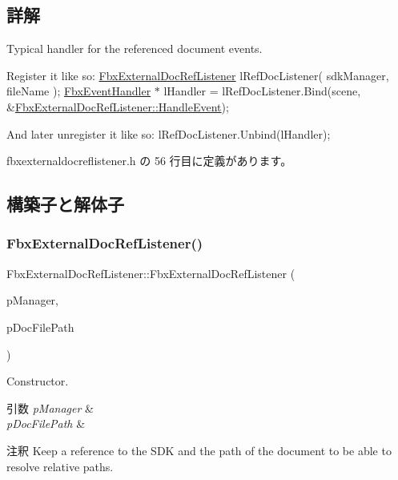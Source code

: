 \subsection{詳解}
Typical handler for the referenced document events.

Register it like so\+: \hyperlink{class_fbx_external_doc_ref_listener}{Fbx\+External\+Doc\+Ref\+Listener} l\+Ref\+Doc\+Listener( sdk\+Manager, file\+Name ); \hyperlink{class_fbx_event_handler}{Fbx\+Event\+Handler} $\ast$ l\+Handler = l\+Ref\+Doc\+Listener.\+Bind(scene, \&\hyperlink{class_fbx_external_doc_ref_listener_ab1517a34510c213bad2750763b502a88}{Fbx\+External\+Doc\+Ref\+Listener\+::\+Handle\+Event});

And later unregister it like so\+: l\+Ref\+Doc\+Listener.\+Unbind(l\+Handler); 

 fbxexternaldocreflistener.\+h の 56 行目に定義があります。



\subsection{構築子と解体子}
\mbox{\label{class_fbx_external_doc_ref_listener_a9118825e2ee04df01ee6117ab55fd175}} 
\subsubsection{\texorpdfstring{Fbx\+External\+Doc\+Ref\+Listener()}{FbxExternalDocRefListener()}}
{\footnotesize\ttfamily Fbx\+External\+Doc\+Ref\+Listener\+::\+Fbx\+External\+Doc\+Ref\+Listener (\begin{DoxyParamCaption}\item[{\hyperlink{class_fbx_manager}{Fbx\+Manager} \&}]{p\+Manager,  }\item[{const \hyperlink{class_fbx_string}{Fbx\+String} \&}]{p\+Doc\+File\+Path }\end{DoxyParamCaption})}

Constructor. 
\begin{DoxyParams}{引数}
{\em p\+Manager} & \\
\hline
{\em p\+Doc\+File\+Path} & \\
\hline
\end{DoxyParams}
\begin{DoxyRemark}{注釈}
Keep a reference to the S\+DK and the path of the document to be able to resolve relative paths. 
\end{DoxyRemark}
\mbox{\label{class_fbx_external_doc_ref_listener_a4145e93503fe9759dcd8a2ddd515d091}} 
